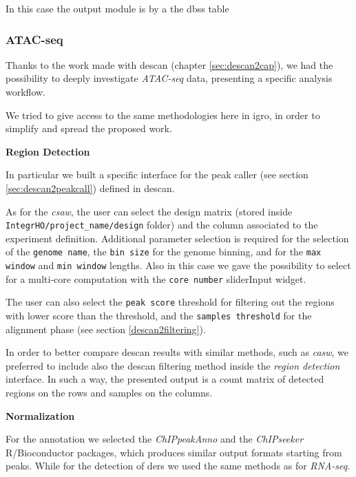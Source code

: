 In this case the output module is by a the \glspl{dbs} table


\subsubsection{ATAC-seq}

Thanks to the work made with \gls{descan} (chapter \ref{sec:descan2cap}), we had the possibility to deeply investigate \textit{ATAC-seq} data, presenting a specific analysis workflow.

We tried to give access to the same methodologies here in \gls{igro}, in order to simplify and spread the proposed work.


{\setlength{\parindent}{0cm}\textbf{Region Detection}}

In particular we built a specific interface for the peak caller (see section \ref{sec:descan2peakcall}) defined in \gls{descan}.

As for the \textit{csaw}, the user can select the design matrix (stored inside \lstinline!IntegrHO/project_name/design! folder) and the column associated to the experiment definition.
Additional parameter selection is required for the selection of the \lstinline!genome name!, the \lstinline!bin size! for the genome binning, and for the \lstinline!max window! and \lstinline!min window! lengths.
Also in this case we gave the possibility to select for a multi-core computation with the \lstinline!core number! sliderInput widget.

The user can also select the \lstinline!peak score! threshold for filtering out the regions with lower score than the threshold, and the \lstinline!samples threshold! for the alignment phase (see section \ref{descan2filtering}).

In order to better compare \gls{descan} results with similar methods, such as \textit{casw}, we preferred to include also the \gls{descan} filtering method inside the \textit{region detection} interface.
In such a way, the presented output is a count matrix of detected regions on the rows and samples on the columns.

{\setlength{\parindent}{0cm}\textbf{Normalization}}



For the annotation we selected the \textit{ChIPpeakAnno} and the \textit{ChIPseeker} R/Bioconductor packages, which produces similar output formats starting from peaks.
While for the detection of \glspl{der} we used the same methods as for \textit{RNA-seq}.

